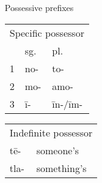 \documentclass[12pt]{beamer}
\newcommand{\nah}[1]{\textcolor{nahgrn}{#1}}
\newcommand{\trs}[1]{\textcolor{nahblu}{#1}}
\begin{document}
\begin{frame}
\begin{columns}[t]
\begin{column}{.22\linewidth}
\begin{example}
\begin{multicols}{2}
\begin{itemize}
          \end{itemize}
        \end{multicols}
      \end{example}
    \end{column}
    \begin{column}{.23\linewidth}
      \begin{block}{Possessive prefixes}
        \begin{tabular}[t]{lll}
          \multicolumn{3}{c}{Specific possessor}\\
          & sg.           & pl.              \\
          1          & \nah{no-}  & \nah{to-}     \\
          2          & \nah{mo-}  & \nah{amo-}    \\
          3          & \nah{ī-}   & \nah{īn-/īm-} \\
        \end{tabular}
        \qquad
        \begin{tabular}[t]{ll}
          \multicolumn{2}{c}{Indefinite possessor}\\
          \nah{tē-} & \trs{someone's}\\
          \nah{tla-} & \trs{something's}
        \end{tabular}
      \end{block}


\end{column}
\end{columns}
\end{frame}
\end{document}
